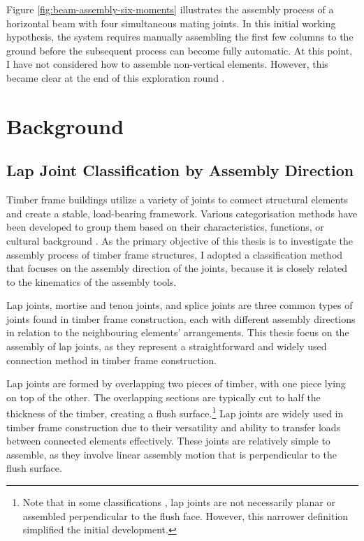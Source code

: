 \FloatBarrier

Figure \ref{fig:beam-assembly-six-moments} illustrates the assembly process of a horizontal beam with four simultaneous mating joints. In this initial working hypothesis, the system requires manually assembling the first few columns to the ground before the subsequent process can become fully automatic. At this point, I have not considered how to assemble non-vertical elements. However, this became clear at the end of this exploration round .


\section{Background}
\label{section:exploration-1-background}

\subsection{Lap Joint Classification by Assembly Direction}
\label{subsection:exploration-1-lap-joint-classification-by-assembly-direction}

Timber frame buildings utilize a variety of joints to connect structural elements and create a stable, load-bearing framework. Various categorisation methods have been developed to group them based on their characteristics, functions, or cultural background . As the primary objective of this thesis is to investigate the assembly process of timber frame structures, I adopted a classification method that focuses on the assembly direction of the joints, because it is closely related to the kinematics of the assembly tools.

Lap joints, mortise and tenon joints, and splice joints are three common types of joints found in timber frame construction, each with different assembly directions in relation to the neighbouring elements' arrangements. This thesis focus on the assembly of lap joints, as they represent a straightforward and widely used connection method in timber frame construction. 

Lap joints are formed by overlapping two pieces of timber, with one piece lying on top of the other. The overlapping sections are typically cut to half the thickness of the timber, creating a flush surface.\footnote{Note that in some classifications \parencite{seikeArtJapaneseJoinery1977}, lap joints are not necessarily planar or assembled perpendicular to the flush face. However, this narrower definition simplified the initial development.} Lap joints are widely used in timber frame construction due to their versatility and ability to transfer loads between connected elements effectively. These joints are relatively simple to assemble, as they involve linear assembly motion that is perpendicular to the flush surface. 

